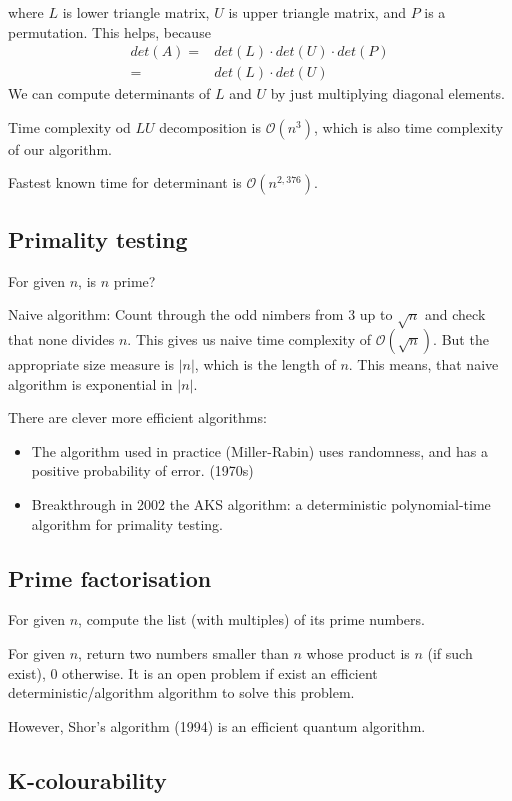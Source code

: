 \documentclass[a4paper,12pt]{article}
\theoremstyle{definition}
\theoremstyle{remark}
\begin{document}
where $L$ is lower triangle matrix, $U$ is upper triangle matrix, and $P$ is a permutation. This helps, because
\begin{align*}
    det(A) =& det(L) \cdot det(U) \cdot det(P) \\
           =& det(L) \cdot det(U)
\end{align*}
We can compute determinants of $L$ and $U$ by just multiplying diagonal elements.

Time complexity od $LU$ decomposition is $\mathscr{O}(n^3)$, which is also time complexity of our algorithm.

Fastest known time for determinant is $\mathscr{O}(n^{2,376})$.

\subsection{Primality testing}
For given $n$, is $n$ prime?

Naive algorithm: Count through the odd nimbers from 3 up to $\sqrt{n}$ and check that none divides $n$. This gives us naive time complexity of $\mathscr{O}(\sqrt{n})$.
But the appropriate size measure is $|n|$, which is the length of $n$. This means, that naive algorithm is exponential in $|n|$.

There are clever more efficient algorithms:
\begin{itemize}
    \item The algorithm used in practice (Miller-Rabin) uses randomness, and has a positive probability of error. (1970s)
    \item Breakthrough in 2002 the AKS algorithm: a deterministic polynomial-time algorithm for primality testing.
\end{itemize}

\subsection{Prime factorisation}
For given $n$, compute the list (with multiples) of its prime numbers.

For given $n$, return two numbers smaller than $n$ whose product is $n$ (if such exist), 0 otherwise. It is an open problem if exist an efficient
deterministic/algorithm algorithm to solve this problem.

However, Shor's algorithm (1994) is an efficient quantum algorithm.

\subsection{K-colourability}
\end{document}
